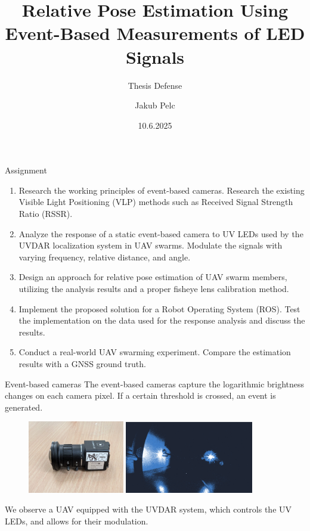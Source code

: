\documentclass{beamer}
\title{Relative Pose Estimation Using Event-Based Measurements of LED Signals}
\subtitle{Thesis Defense}
\date{10.6.2025}
\author{Jakub Pelc}
\institute{Faculty of Electrical Engineering, Czech Technical University in Prague \\ Multi-robot Systems Group}
\begin{document}
\maketitle

\begin{frame}{Assignment}

\small{
\begin{enumerate}
    \item Research the working principles of event-based cameras. Research the existing Visible Light Positioning (VLP) methods such as Received Signal Strength Ratio (RSSR).
    \item Analyze the response of a static event-based camera to UV LEDs used by the UVDAR localization system in UAV swarms. Modulate the signals with varying frequency, relative distance, and angle.
    \item Design an approach for relative pose estimation of UAV swarm members, utilizing the analysis results and a proper
fisheye lens calibration method.
    \item Implement the proposed solution for a Robot Operating System (ROS). Test the implementation on the data used for
the response analysis and discuss the results.
    \item Conduct a real-world UAV swarming experiment. Compare the estimation results with a GNSS ground truth. 
\end{enumerate}
}

\end{frame}


\begin{frame}{Event-based cameras}
The event-based cameras capture the logarithmic brightness changes on each camera pixel. If a certain threshold is crossed, an event is generated.

\begin{figure}[H]
    \centering
    \includegraphics[width=0.374\textwidth]{../fig/photos/evk4.jpg}
    \includegraphics[width=0.50\textwidth]{../fig/photos/meas1.png}
    \label{fig:evk4}
\end{figure}

We observe a UAV equipped with the UVDAR system, which controls the UV LEDs, and allows for their modulation.

\end{frame}
\end{document}
